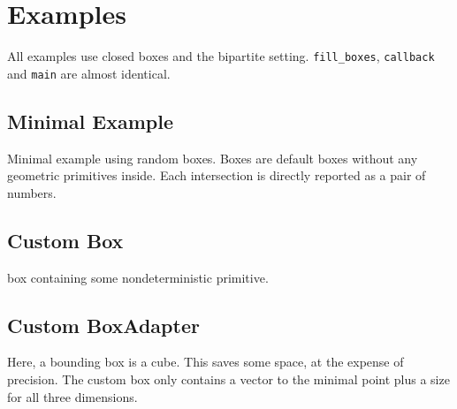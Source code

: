  
\section*{Examples}
All examples use closed boxes and the bipartite setting. \texttt{fill\_boxes}, \texttt{callback} and \texttt{main} are almost identical.
\subsection*{Minimal Example}
Minimal example using random boxes. Boxes are default boxes without any geometric primitives inside. Each intersection is directly reported as a pair of numbers. 

\subsection*{Custom Box}
box containing some nondeterministic primitive. 

\subsection*{Custom BoxAdapter }
Here, a bounding box is a cube. This saves some space, at the expense of precision. The custom box only contains a vector to the minimal point plus a size for all three dimensions.




